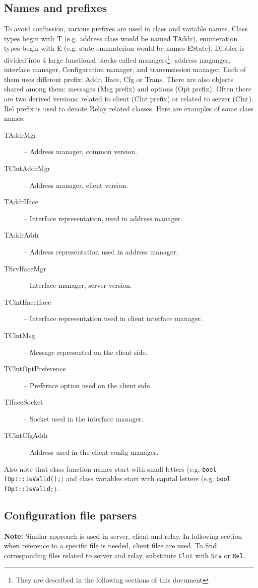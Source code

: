\subsection{Names and prefixes}
To avoid confussion, various prefixes are used in class and variable
names. Class types begin with T (e.g. address class would be named
TAddr), enumeration types begin with E (e.g. state enumaterion would
be names EState). Dibbler is divided into 4 large functional blocks
called managers\footnote{They are described in the following sections
  of this document}: address maganger, interface manager, Configuration
manager, and transmsission manager. Each of them uses different
prefix: Addr, Iface, Cfg or Trans. There are also objects shared among
them: messages (Msg prefix) and options (Opt prefix). Often there are
two derived versions: related to client (Clnt prefix) or related to
server (Clnt). Rel prefix is used to denote Relay related classes. 
Here are examples of some class names:
\begin{description}
\item[TAddrMgr] -- Address manager, common version.
\item[TClntAddrMgr] -- Address manager, client version.
\item[TAddrIface] -- Interface representation, used in address manager.
\item[TAddrAddr] -- Address representation used in address manager.
\item[TSrvIfaceMgr] -- Interface manager, server version.
\item[TClntIfaceIface] -- Interface representation used in client
  interface manager.
\item[TClntMsg] -- Message represented on the client side.
\item[TClntOptPreference] -- Prefernce option used on the client side.
\item[TIfaceSocket] -- Socket used in the interface manager.
\item[TClntCfgAddr] -- Address used in the client config manager.
\end{description}

Also note that class function names start with small letters
(e.g. \verb+bool TOpt::isValid();+) and class variables start with capital
letters (e.g. \verb+bool TOpt::IsValid;+).

\subsection{Configuration file parsers}
\textbf{Note:} Similar approach is used in server, client and
relay. In following section when reference to a specific file is needed,
client files are used. To find corresponding files related to server and
relay, substitute \verb+Clnt+ with \verb+Srv+ or \verb+Rel+.

